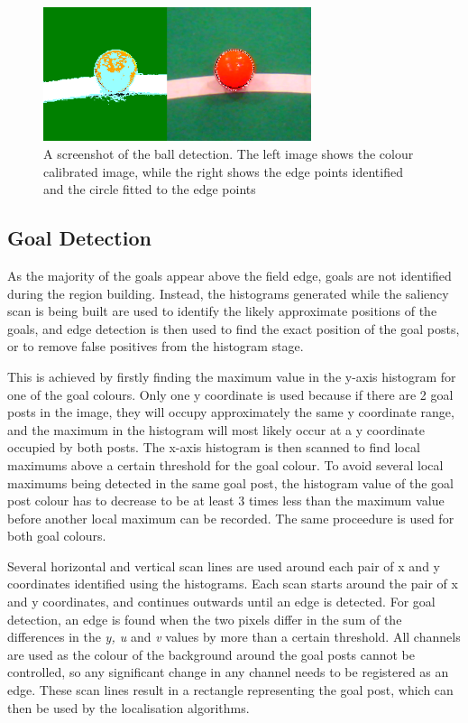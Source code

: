 \documentclass[runningheads,a4paper]{llncs}
\begin{document}
\begin{figure} [t]
\centering
\includegraphics[width=0.7\textwidth]{figures/ballDetectionScreenshot.png}
\caption{A screenshot of the ball detection. The left image shows the colour calibrated image, while the right shows the edge points identified and the circle fitted to the edge points} \label{fig:ballDetection}
\end{figure}

\subsection{Goal Detection}

As the majority of the goals appear above the field edge, goals are not identified during the region building. Instead, the histograms generated while the saliency scan is being built are used to identify the likely approximate positions of the goals, and edge detection is then used to find the exact position of the goal posts, or to remove false positives from the histogram stage.

This is achieved by firstly finding the maximum value in the y-axis histogram for one of the goal colours.  Only one y coordinate is used because if there are 2 goal posts in the image, they will occupy approximately the same y coordinate range, and the maximum in the histogram will most likely occur at a y coordinate occupied by both posts. The x-axis histogram is then scanned to find local maximums above a certain threshold for the goal colour. To avoid several local maximums being detected in the same goal post, the histogram value of the goal post colour has to decrease to be at least 3 times less than the maximum value before another local maximum can be recorded. The same proceedure is used for both goal colours.

Several horizontal and vertical scan lines are used around each pair of x and y coordinates identified using the histograms. Each scan starts around the pair of x and y coordinates, and continues outwards until an edge is detected. For goal detection, an edge is found when the two pixels differ in the sum of the differences in the \emph{y, u} and \emph{v} values by more than a certain threshold. All channels are used as the colour of the background around the goal posts cannot be controlled, so any significant change in any channel needs to be registered as an edge. These scan lines result in a rectangle representing the goal post, which can then be used by the localisation algorithms.
\end{document}
